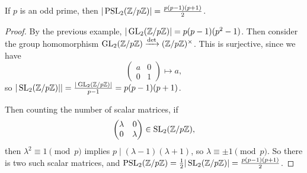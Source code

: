 \documentclass[a4paper]{scrartcl}
\begin{document}
\begin{lemma}
	If $p$ is an odd prime, then $|\operatorname{PSL}_2(\mathbb{Z}/p\mathbb{Z})| = \frac{p(p - 1)(p + 1)}{2}$.
\end{lemma}
\begin{proof}
	By the previous example, $|\operatorname{GL}_2(\mathbb{Z}/p\mathbb{Z})| = p(p-1)(p^2 - 1)$. Then consider the group homomorphism $\operatorname{GL}_2(\mathbb{Z}/p\mathbb{Z}) \xrightarrow{\det} (\mathbb{Z}/p\mathbb{Z})^\times$. This is surjective, since we have
	$$
\begin{pmatrix}
	a & 0 \\
	0 & 1
\end{pmatrix} \longmapsto a,
	$$
	so $|\operatorname{SL}_2(\mathbb{Z}/p\mathbb{Z})|| = \frac{|\operatorname{GL}_2(\mathbb{Z}/p\mathbb{Z})|}{p - 1} = p(p - 1)(p + 1)$. 

	Then counting the number of scalar matrices, if
	$$
	\begin{pmatrix}
		\lambda & 0 \\ 0 & \lambda
	\end{pmatrix} \in \operatorname{SL}_2(\mathbb{Z}/p\mathbb{Z}),
	$$
	then $\lambda^2 \equiv 1\pmod{p}$ implies $p \mid (\lambda - 1)(\lambda + 1)$, so $\lambda \equiv \pm 1 \pmod{p}$. So there is two such scalar matrices, and $\operatorname{PSL}_2(\mathbb{Z}/p\mathbb{Z}) = \frac{1}{2}|\operatorname{SL}_2(\mathbb{Z}/p\mathbb{Z})| = \frac{p(p - 1)(p + 1)}{2}$.
\end{proof}
\end{document}
